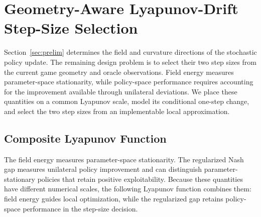 \documentclass[journal]{IEEEtran}
\theoremstyle{remark}
\begin{document}
	\section{Geometry-Aware Lyapunov-Drift Step-Size Selection}\label{sec:drift}
	Section~\ref{sec:prelim} determines the field and curvature directions of the stochastic policy update.
	The remaining design problem is to select their two step sizes from the current game geometry and oracle observations.
	Field energy measures parameter-space stationarity, while policy-space performance requires accounting for the improvement available through unilateral deviations.
	We place these quantities on a common Lyapunov scale, model its conditional one-step change, and select the two step sizes from an implementable local approximation.
	
	\subsection{Composite Lyapunov Function}\label{subsec:V_drift}
	The field energy measures parameter-space stationarity.
	The regularized Nash gap measures unilateral policy improvement and can distinguish parameter-stationary policies that retain positive exploitability.
	Because these quantities have different numerical scales, the following Lyapunov function combines them: field energy guides local optimization, while the regularized gap retains policy-space performance in the step-size decision.
	
\end{document}

